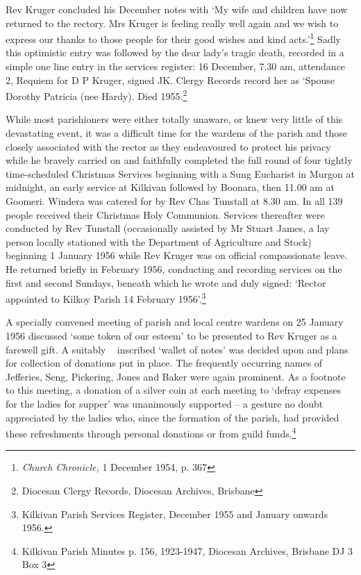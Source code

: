 Rev Kruger concluded his December notes with `My wife and children have now returned to the rectory. Mrs Kruger is feeling really well again and we wish to express our thanks to those people for their good wishes and kind acts.'\footnote{\emph{Church Chronicle,} 1 December 1954, p. 367} Sadly this optimistic entry was followed by the dear lady's tragic death, recorded in a simple one line entry in the services register: 16 December, 7.30 am, attendance 2, Requiem for D P Kruger, signed JK. Clergy Records record her as `Spouse Dorothy Patricia (nee Hardy). Died 1955.\footnote{Diocesan Clergy Records, Diocesan Archives, Brisbane}


While most parishioners were either totally unaware, or knew very little of this devastating event, it was a difficult time for the wardens of the parish and those closely associated with the rector as they endeavoured to protect his privacy while he bravely carried on and faithfully completed the full round of four tightly time-scheduled Christmas Services beginning with a Sung Eucharist in Murgon at midnight, an early service at Kilkivan followed by Boonara, then 11.00 am at Goomeri. Windera was catered for by Rev Chas Tunstall at 8.30 am. In all 139 people received their Christmas Holy Communion. Services thereafter were conducted by Rev Tunstall (occasionally assisted by Mr Stuart James, a lay person locally stationed with the Department of Agriculture and Stock) beginning 1 January 1956 while Rev Kruger was on official compassionate leave. He returned briefly in February 1956, conducting and recording services on the first and second Sundays, beneath which he wrote and duly signed: `Rector appointed to Kilkoy Parish 14 February 1956'.\footnote{Kilkivan Parish Services Register, December 1955 and January onwards 1956.}


A specially convened meeting of parish and local centre wardens on 25 January 1956 discussed `some token of our esteem' to be presented to Rev Kruger as a farewell gift. A suitably ~ inscribed `wallet of notes' was decided upon and plans for collection of donations put in place. The frequently occurring names of Jefferies, Seng, Pickering, Jones and Baker were again prominent. As a footnote to this meeting, a donation of a silver coin at each meeting to `defray expenses for the ladies for supper' was unanimously supported -- a gesture no doubt appreciated by the ladies who, since the formation of the parish, had provided these refreshments through personal donations or from guild funds.\footnote{Kilkivan Parish Minutes p. 156, 1923-1947, Diocesan Archives, Brisbane DJ 3 Box 3}


